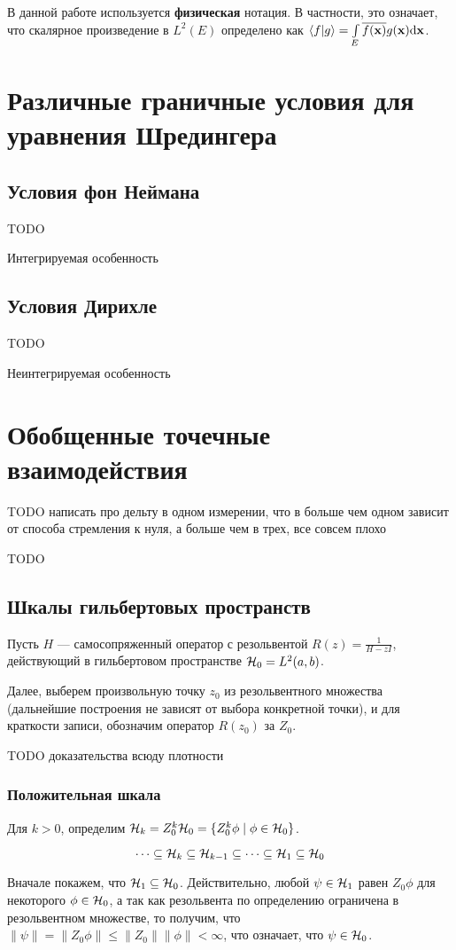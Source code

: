 В данной работе используется \textbf{физическая} нотация. В частности, это означает, что скалярное произведение в $L^2(E)$ определено как $\ip{f}{g} = \int\limits_E \cconj{f(\vb{x})} g(\vb{x}) \dd \vb{x}$.

\section{Различные граничные условия для уравнения Шредингера}

\subsection{Условия фон Неймана}
TODO

Интегрируемая особенность
\subsection{Условия Дирихле}
TODO

Неинтегрируемая особенность

\section{Обобщенные точечные взаимодействия}

TODO написать про дельту в одном измерении, что в больше чем одном зависит от способа стремления к нуля, а больше чем в трех, все совсем плохо

TODO
\subsection{Шкалы гильбертовых пространств}
Пусть $H$ — самосопряженный оператор с резольвентой $R(z) = \frac{1}{H - z I}$, действующий в гильбертовом пространстве $\mathcal{H}_{0} = L^2(a, b)$.

Далее, выберем произвольную точку $z_0$ из резольвентного множества (дальнейшие построения не зависят от выбора конкретной точки), и для краткости записи, обозначим оператор $R(z_0)$ за $Z_0$.


TODO доказательства всюду плотности
\subsubsection{Положительная шкала}
Для $k > 0$, определим $\mathcal{H}_{k} = Z_0^k \mathcal{H}_{0} = \{ Z_0^k \phi \mid \phi \in \mathcal{H}_{0} \}$.

\begin{prop}
\[
\dots \subseteq \mathcal{H}_{k} \subseteq \mathcal{H}_{k - 1} \subseteq \dots \subseteq \mathcal{H}_{1} \subseteq{\mathcal{H}_{0}}
\]
\end{prop}
Вначале покажем, что $\mathcal{H}_{1} \subseteq \mathcal{H}_{0}$. Действительно, любой $\psi \in \mathcal{H}_{1}$ равен $Z_0 \phi$ для некоторого $\phi \in \mathcal{H}_{0}$, а так как резольвента по определению ограничена в резольвентном множестве, то получим, что $\| \psi \| = \| Z_0 \phi \| \le \|Z_0\| \|\phi\| < \infty$, что означает, что $\psi \in \mathcal{H}_{0}$.

